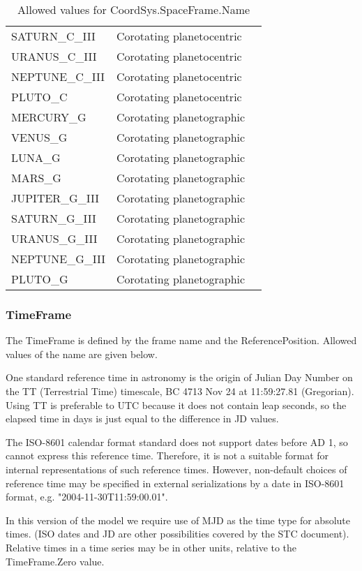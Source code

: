 \documentclass[11pt]{article}
\begin{document}
\begin{table}[h]
\begin{tabular}{|lll|}
SATURN\_C\_III& Corotating planetocentric & \\
URANUS\_C\_III& Corotating planetocentric & \\
NEPTUNE\_C\_III& Corotating planetocentric & \\
PLUTO\_C  &Corotating planetocentric & \\
MERCURY\_G & Corotating planetographic&\\
VENUS\_G   & Corotating planetographic&\\
LUNA\_G & Corotating planetographic&\\
MARS\_G & Corotating planetographic&\\
JUPITER\_G\_III&Corotating planetographic&\\
SATURN\_G\_III&Corotating planetographic&\\
URANUS\_G\_III&Corotating planetographic&\\
NEPTUNE\_G\_III&Corotating planetographic&\\
PLUTO\_G&Corotating planetographic&\\
\hline
\end{tabular}
\caption{Allowed values for CoordSys.SpaceFrame.Name}
\end{table}


\subsubsection{TimeFrame}

The TimeFrame is defined by the frame name and the ReferencePosition.
Allowed values of the name are given below.

One standard reference time in astronomy is the origin 
of Julian Day Number on the TT (Terrestrial
Time) timescale, BC 4713 Nov  24 at 11:59:27.81 (Gregorian).
Using TT is preferable to UTC because it does not
contain leap seconds, so the elapsed time in days is just equal to the
difference in JD values.
  
The ISO-8601 calendar format standard
does not support dates before AD 1, so cannot express this reference
time. Therefore, it is not a suitable format for internal
representations of such reference times. However, non-default choices of 
reference time may be specified in external serializations
by a date in ISO-8601 format, e.g. "2004-11-30T11:59:00.01".
 
In this version of the model we require use of MJD as the time type
for absolute times.
(ISO dates and JD are other possibilities covered by the STC document).
Relative times in a time series may be in other units, relative to
the TimeFrame.Zero value.
\end{document}
